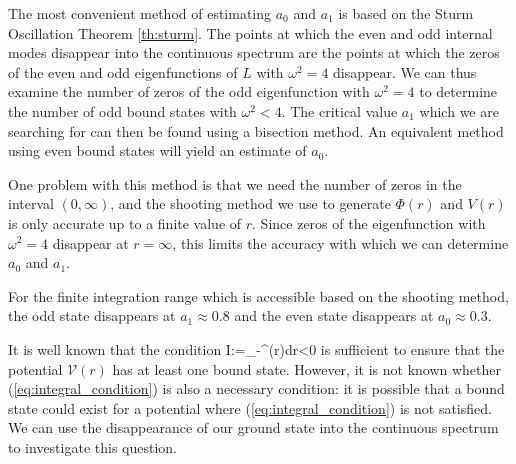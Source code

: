 

The most convenient method of estimating $a_0$ and $a_1$ is based on the Sturm Oscillation Theorem \ref{th:sturm}. The points at which the even and odd internal modes disappear into the continuous spectrum are the points at which the zeros of the even and odd eigenfunctions of $L$ with $\omega^2=4$ disappear. We can thus examine the number of zeros of the odd eigenfunction with $\omega^2=4$ to determine the number of odd bound states with $\omega^2<4$. The critical value $a_1$ which we are searching for can then be found using a bisection method. An equivalent method using even bound states will yield an estimate of $a_0$.

One problem with this method is that we need the number of zeros in the interval $(0,\infty)$, and the shooting method we use to generate $\Phi(r)$ and $V(r)$ is only accurate up to a finite value of $r$. Since zeros of the eigenfunction with $\omega^2=4$ disappear at $r=\infty$, this limits the accuracy with which we can determine $a_0$ and $a_1$.

For the finite integration range which is accessible based on the shooting method, the odd state disappears at $a_1 \approx 0.8$ and the even state disappears at $a_0 \approx 0.3$.

It is well known that the condition
\be
\label{eq:integral_condition}
I:=\int_{-\infty}^{\infty}(r)dr<0
\ee
is sufficient to ensure that the potential $\mathcal{V}(r)$ has at least one bound state. However, it is not known whether (\ref{eq:integral_condition}) is also a necessary condition: it is possible that a bound state could exist for a potential where (\ref{eq:integral_condition}) is not satisfied. We can use the disappearance of our ground state into the continuous spectrum to investigate this question.

